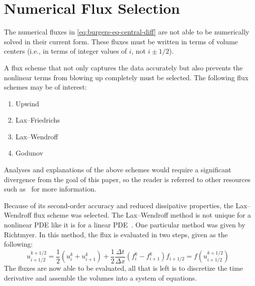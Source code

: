 \documentclass[ltr]{ornltm} %
\numberwithin{equation}{section}
\begin{document}
	\section{Numerical Flux Selection} \label{sec:numerical-flux-selection}
	The numerical fluxes in \cref{eq:burgers-eq-central-diff} are not able to be numerically solved in their current form.
	These fluxes must be written in terms of volume centers (i.e., in terms of integer values of $i$, not $i\pm 1/2$).

	A flux scheme that not only captures the data accurately but also prevents the nonlinear terms from blowing up completely must be selected.
	The following flux schemes may be of interest:
	\begin{enumerate}
		\item Upwind
		\item Lax--Friedrichs
		\item Lax--Wendroff
		\item Godunov
	\end{enumerate}
	Analyses and explanations of the above schemes would require a significant divergence from the goal of this paper, so the reader is referred to other resources such as~\autocite{alma992854184708136} for more information.

	Because of its second-order accuracy and reduced dissipative properties, the Lax--Wendroff flux scheme was selected.
	The Lax--Wendroff method is not unique for a nonlinear PDE like it is for a linear PDE~\autocite{LaxWendroffMethodEncyclopedia}.
	One particular method was given by Richtmyer.
	In this method, the flux is evaluated in two steps, given as the following:
	\begin{subequations}
		\begin{equation}
			\label{eq:richtmyer-1st-step}
			u_{i+1/2}^{k+1/2}=\frac{1}{2}\left( u_i^k+u_{i+1}^k \right)+\frac{1}{2}\frac{\Delta t}{\Delta x}\left( f_i^k-f_{i+1}^k \right)
		\end{equation}
		\begin{equation}
			\label{eq:richtmyer-2nd-step}
			f_{i+1/2}=f\left( u_{i+1/2}^{k+1/2} \right)
		\end{equation}
	\end{subequations}
	The fluxes are now able to be evaluated, all that is left is to discretize the time derivative and assemble the volumes into a system of equations.
\end{document}
